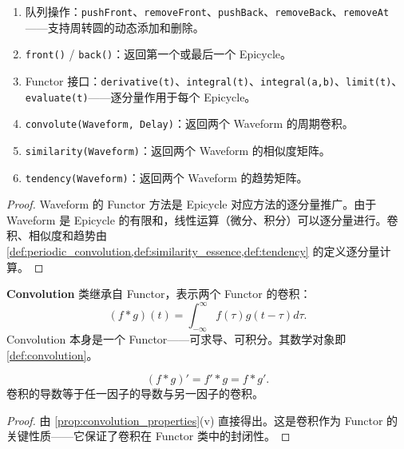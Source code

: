 \begin{property}\label{prop:waveform_class_methods}
\begin{enumerate}[label=(\roman*)]
    \item 队列操作：\texttt{pushFront}、\texttt{removeFront}、\texttt{pushBack}、\texttt{removeBack}、\texttt{removeAt}——支持周转圆的动态添加和删除。
    \item \texttt{front()} / \texttt{back()}：返回第一个或最后一个 Epicycle。
    \item Functor 接口：\texttt{derivative(t)}、\texttt{integral(t)}、\texttt{integral(a,b)}、\texttt{limit(t)}、\texttt{evaluate(t)}——逐分量作用于每个 Epicycle。
    \item \texttt{convolute(Waveform, Delay)}：返回两个 Waveform 的周期卷积。
    \item \texttt{similarity(Waveform)}：返回两个 Waveform 的相似度矩阵。
    \item \texttt{tendency(Waveform)}：返回两个 Waveform 的趋势矩阵。
\end{enumerate}
\end{property}

\begin{proof}
Waveform 的 Functor 方法是 Epicycle 对应方法的逐分量推广。由于 Waveform 是 Epicycle 的有限和，线性运算（微分、积分）可以逐分量进行。卷积、相似度和趋势由 \cref{def:periodic_convolution,def:similarity_essence,def:tendency} 的定义逐分量计算。
\end{proof}

\begin{definition}[Convolution 类]\label{def:convolution_class}
\textbf{Convolution} 类继承自 Functor，表示两个 Functor 的卷积：
\[
(f * g)(t) = \int_{-\infty}^{\infty} f(\tau) g(t - \tau) d\tau.
\]
Convolution 本身是一个 Functor——可求导、可积分。其数学对象即 \cref{def:convolution}。
\end{definition}

\begin{property}\label{prop:convolution_class_derivative}
\[
(f * g)' = f' * g = f * g'.
\]
卷积的导数等于任一因子的导数与另一因子的卷积。
\end{property}

\begin{proof}
由 \cref{prop:convolution_properties}(v) 直接得出。这是卷积作为 Functor 的关键性质——它保证了卷积在 Functor 类中的封闭性。
\end{proof}

\newpage

